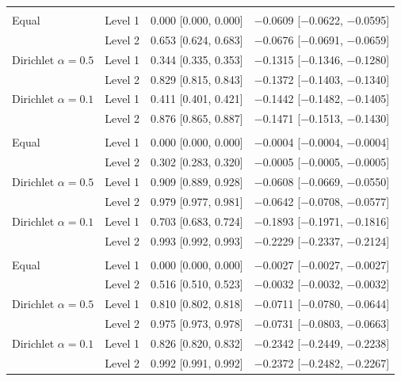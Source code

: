 \begin{tabular}{llcc}
\addlinespace
\multicolumn{4}{@{}l}{\textit{Diabetic, XGBoost}} \\
Equal & Level 1 & 0.000 [0.000, 0.000] & $-$0.0609 [$-$0.0622, $-$0.0595] \\
 & Level 2 & 0.653 [0.624, 0.683] & $-$0.0676 [$-$0.0691, $-$0.0659] \\
Dirichlet $\alpha=0.5$ & Level 1 & 0.344 [0.335, 0.353] & $-$0.1315 [$-$0.1346, $-$0.1280] \\
 & Level 2 & 0.829 [0.815, 0.843] & $-$0.1372 [$-$0.1403, $-$0.1340] \\
Dirichlet $\alpha=0.1$ & Level 1 & 0.411 [0.401, 0.421] & $-$0.1442 [$-$0.1482, $-$0.1405] \\
 & Level 2 & 0.876 [0.865, 0.887] & $-$0.1471 [$-$0.1513, $-$0.1430] \\
\addlinespace
\multicolumn{4}{@{}l}{\textit{Heart, Random Forest}} \\
Equal & Level 1 & 0.000 [0.000, 0.000] & $-$0.0004 [$-$0.0004, $-$0.0004] \\
 & Level 2 & 0.302 [0.283, 0.320] & $-$0.0005 [$-$0.0005, $-$0.0005] \\
Dirichlet $\alpha=0.5$ & Level 1 & 0.909 [0.889, 0.928] & $-$0.0608 [$-$0.0669, $-$0.0550] \\
 & Level 2 & 0.979 [0.977, 0.981] & $-$0.0642 [$-$0.0708, $-$0.0577] \\
Dirichlet $\alpha=0.1$ & Level 1 & 0.703 [0.683, 0.724] & $-$0.1893 [$-$0.1971, $-$0.1816] \\
 & Level 2 & 0.993 [0.992, 0.993] & $-$0.2229 [$-$0.2337, $-$0.2124] \\
\addlinespace
\multicolumn{4}{@{}l}{\textit{Heart, XGBoost}} \\
Equal & Level 1 & 0.000 [0.000, 0.000] & $-$0.0027 [$-$0.0027, $-$0.0027] \\
 & Level 2 & 0.516 [0.510, 0.523] & $-$0.0032 [$-$0.0032, $-$0.0032] \\
Dirichlet $\alpha=0.5$ & Level 1 & 0.810 [0.802, 0.818] & $-$0.0711 [$-$0.0780, $-$0.0644] \\
 & Level 2 & 0.975 [0.973, 0.978] & $-$0.0731 [$-$0.0803, $-$0.0663] \\
Dirichlet $\alpha=0.1$ & Level 1 & 0.826 [0.820, 0.832] & $-$0.2342 [$-$0.2449, $-$0.2238] \\
 & Level 2 & 0.992 [0.991, 0.992] & $-$0.2372 [$-$0.2482, $-$0.2267] \\
\bottomrule
\end{tabular}
